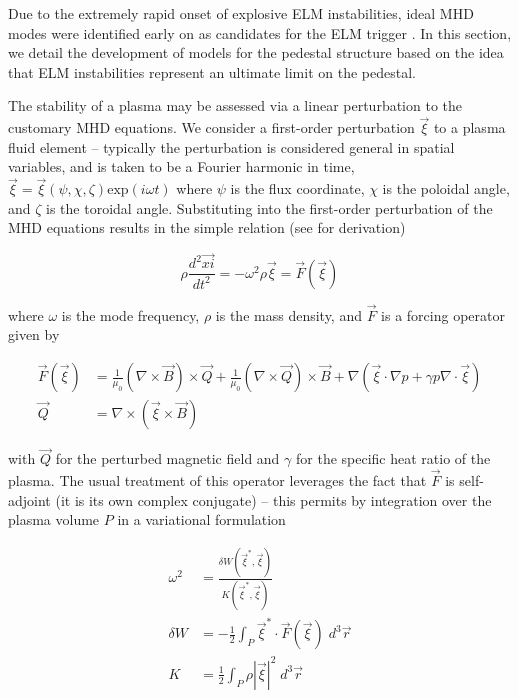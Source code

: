 Due to the extremely rapid onset of explosive ELM instabilities, ideal MHD modes were identified early on as candidates for the ELM trigger \cite{Wagner1982,Keilhacker1984,Huysmans2005}.  In this section, we detail the development of models for the pedestal structure based on the idea that ELM instabilities represent an ultimate limit on the pedestal.

The stability of a plasma may be assessed via a linear perturbation to the customary MHD equations.  We consider a first-order perturbation $\vec{\xi}$ to a plasma fluid element -- typically the perturbation is considered general in spatial variables, and is taken to be a Fourier harmonic in time, $\vec{\xi} = \vec{\xi}(\psi,\chi,\zeta) \mbox{exp}(i\omega t)$ where $\psi$ is the flux coordinate, $\chi$ is the poloidal angle, and $\zeta$ is the  toroidal angle.  Substituting into the first-order perturbation of the MHD equations results in the simple relation (see \cite[\S 8]{Freidberg1987} for derivation)

\begin{equation}\label{eq:mhd_perturb}
 \rho \frac{d^2 \vec{xi}}{dt^2} = -\omega^2 \rho \vec{\xi} = \vec{F}(\vec{\xi})
\end{equation}

\noindent where $\omega$ is the mode frequency, $\rho$ is the mass density, and $\vec{F}$ is a forcing operator given by

\begin{equation}\label{eq:forcing}
 \begin{aligned}
  \vec{F}(\vec{\xi}) &= \frac{1}{\mu_0} \left( \nabla \times \vec{B} \right) \times \vec{Q} + \frac{1}{\mu_0} \left( \nabla \times \vec{Q} \right) \times \vec{B} + \nabla \left( \vec{\xi} \cdot \nabla p + \gamma p \nabla \cdot \vec{\xi} \right)\\
  \vec{Q} &= \nabla \times \left( \vec{\xi} \times \vec{B} \right)
 \end{aligned}
\end{equation}

\noindent with $\vec{Q}$ for the perturbed magnetic field and $\gamma$ for the specific heat ratio of the plasma.  The usual treatment of this operator leverages the fact that $\vec{F}$ is self-adjoint (\ie it is its own complex conjugate) -- this permits by integration over the plasma volume $P$ in a variational formulation

\begin{equation}\label{eq:energyprinciple}
 \begin{aligned}
  \omega^2 &= \frac{\delta W(\vec{\xi}^*,\vec{\xi})}{K(\vec{\xi}^*,\vec{\xi})}\\
  \delta W &= -\frac{1}{2} \int_P \vec{\xi}^* \cdot \vec{F}(\vec{\xi}) \;d^3 \vec{r}\\
  K &= \frac{1}{2} \int_P \rho \left| \vec{\xi} \right|^2 \;d^3 \vec{r}
 \end{aligned}
\end{equation}

